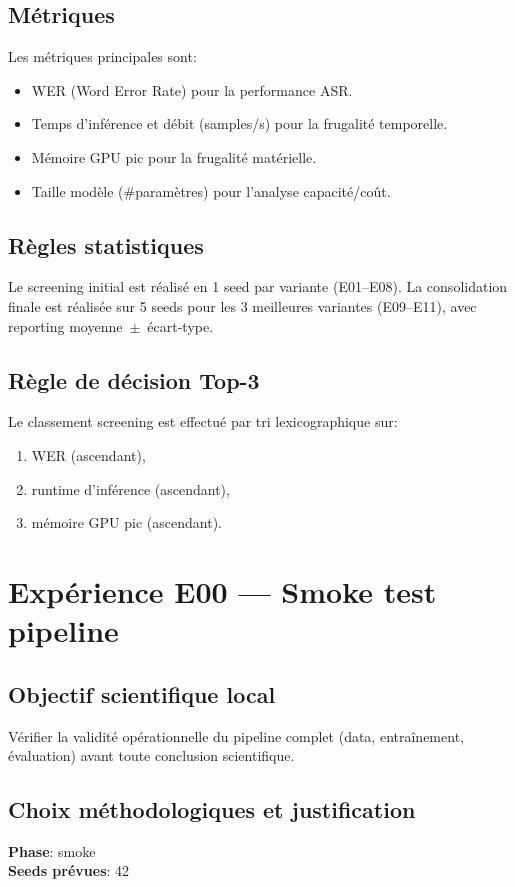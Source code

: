 \documentclass[11pt,a4paper]{article}
\begin{document}
\subsection{Métriques}
Les métriques principales sont:
\begin{itemize}
\item WER (Word Error Rate) pour la performance ASR.
\item Temps d'inférence et débit (samples/s) pour la frugalité temporelle.
\item Mémoire GPU pic pour la frugalité matérielle.
\item Taille modèle (\#paramètres) pour l'analyse capacité/coût.
\end{itemize}

\subsection{Règles statistiques}
Le screening initial est réalisé en 1 seed par variante (E01--E08).
La consolidation finale est réalisée sur 5 seeds pour les 3 meilleures variantes (E09--E11), avec reporting moyenne~$\pm$~écart-type.

\subsection{Règle de décision Top-3}
Le classement screening est effectué par tri lexicographique sur:
\begin{enumerate}
\item WER (ascendant),
\item runtime d'inférence (ascendant),
\item mémoire GPU pic (ascendant).
\end{enumerate}


\section{Expérience E00 --- Smoke test pipeline}
\subsection{Objectif scientifique local}
Vérifier la validité opérationnelle du pipeline complet (data, entraînement, évaluation) avant toute conclusion scientifique.

\subsection{Choix méthodologiques et justification}
\textbf{Phase}: smoke\\
\textbf{Seeds prévues}: 42\\
\end{document}

